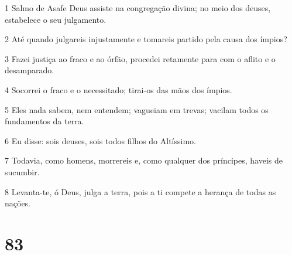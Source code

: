 \par 1 Salmo de Asafe Deus assiste na congregação divina; no meio dos deuses, estabelece o seu julgamento.
\par 2 Até quando julgareis injustamente e tomareis partido pela causa dos ímpios?
\par 3 Fazei justiça ao fraco e ao órfão, procedei retamente para com o aflito e o desamparado.
\par 4 Socorrei o fraco e o necessitado; tirai-os das mãos dos ímpios.
\par 5 Eles nada sabem, nem entendem; vagueiam em trevas; vacilam todos os fundamentos da terra.
\par 6 Eu disse: sois deuses, sois todos filhos do Altíssimo.
\par 7 Todavia, como homens, morrereis e, como qualquer dos príncipes, haveis de sucumbir.
\par 8 Levanta-te, ó Deus, julga a terra, pois a ti compete a herança de todas as nações.

\chapter{83}

